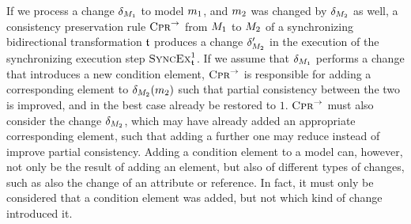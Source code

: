 If we process a change $\change{\metamodel{M}{1}}$ to model $\model{m}{1}$, and $\model{m}{2}$ was changed by $\change{\metamodel{M}{2}}$ as well,
a consistency preservation rule $\textsc{Cpr}_{}^{\rightarrow}$ from $\metamodel{M}{1}$ to $\metamodel{M}{2}$ of a synchronizing bidirectional transformation $\transformation{t}$ produces a change $\change{\metamodel{M}{2}}'$ in the execution of the synchronizing execution step $\function{SyncEx}_{\transformation{t}}^1$.
If we assume that $\change{\metamodel{M}{1}}$ performs a change that introduces a new condition element, $\textsc{Cpr}_{}^{\rightarrow}$ is responsible for adding a corresponding element to $\change{\metamodel{M}{2}}(\model{m}{2})$ such that partial consistency between the two is improved, and in the best case already be restored to $1$.
$\textsc{Cpr}_{}^{\rightarrow}$ must also consider the change $\change{\metamodel{M}{2}}$, which may have already added an appropriate corresponding element, such that adding a further one may reduce instead of improve partial consistency.
Adding a condition element to a model can, however, not only be the result of adding an element, but also of different types of changes, such as also the change of an attribute or reference.
In fact, it must only be considered that a condition element was added, but not which kind of change introduced it.


